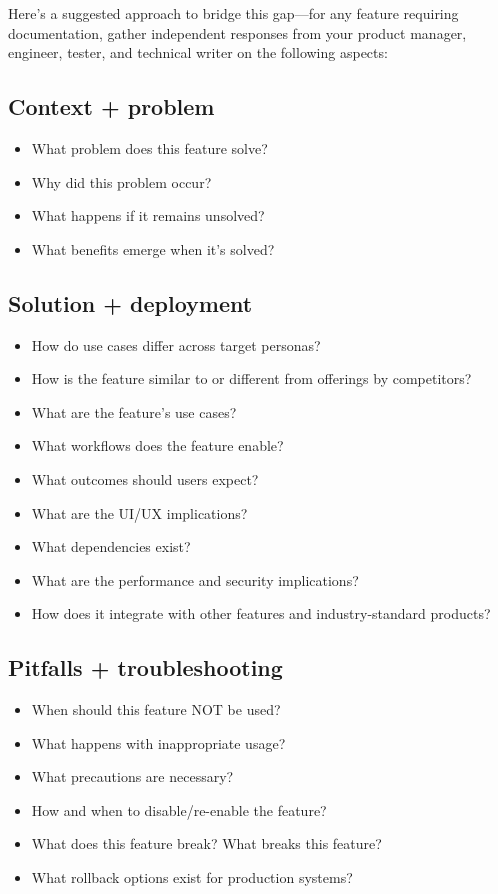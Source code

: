 \documentclass{article}
\begin{document}
Here's a suggested approach to bridge this gap---for any feature requiring documentation, gather independent responses from your product manager, engineer, tester, and technical writer on the following aspects:

\subsection*{Context + problem}

\begin{itemize}
    \item What problem does this feature solve?
    \item Why did this problem occur?
    \item What happens if it remains unsolved?
    \item What benefits emerge when it's solved?
\end{itemize}

\subsection*{Solution + deployment}

\begin{itemize}
    \item How do use cases differ across target personas?
    \item How is the feature similar to or different from offerings by competitors?
    \item What are the feature's use cases?
    \item What workflows does the feature enable?
    \item What outcomes should users expect?
    \item What are the UI/UX implications?
    \item What dependencies exist?
    \item What are the performance and security implications?
    \item How does it integrate with other features and industry-standard products?
\end{itemize}

\subsection*{Pitfalls + troubleshooting}

\begin{itemize}
    \item When should this feature NOT be used?
    \item What happens with inappropriate usage?
    \item What precautions are necessary?
    \item How and when to disable/re-enable the feature?
    \item What does this feature break? What breaks this feature?
    \item What rollback options exist for production systems?
\end{itemize}
\end{document}
